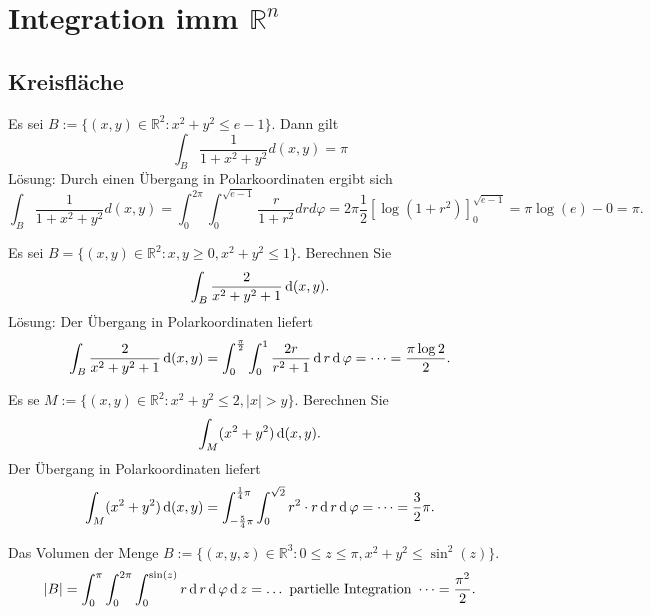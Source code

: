 \section{Integration imm $\mathbb{R}^n$}
\subsection{Kreisfläche}
Es sei $B:= \{(x,y) \in \mathbb{R}^2 : x^2 + y^2 \leq e - 1\}$.
Dann gilt
\begin{displaymath}
  \int_{B} \frac{1}{1 + x^2 + y^2}d(x,y) = \pi
\end{displaymath}
Lösung:
Durch einen Übergang in Polarkoordinaten ergibt sich
\begin{displaymath}
  \int_{B} \frac{1}{1 + x^2 + y^2} d(x,y) = \int_{0}^{2\pi} \int_{0}^{\sqrt{e - 1}} \frac{r}{1 + r^2} drd\varphi = 2\pi \frac{1}{2}[\log(1 + r^2)]_{0}^{\sqrt{e-1}} = \pi \log(e) - 0 = \pi.
\end{displaymath}

Es sei $B = \{(x,y) \in \mathbb{R}^2 : x,y \geq 0, x^2 + y^2 \leq 1\}$.
Berechnen Sie
\begin{displaymath}
  \int_B \frac{2}{x^2 + y^2 + 1} \operatorname{\mathop{}\!\mathrm{d}} (x,y).
\end{displaymath}
Lösung:
Der Übergang in Polarkoordinaten liefert
\begin{displaymath}
  \int_B \frac{2}{x^2 + y^2 + 1} \operatorname{\mathop{}\!\mathrm{d}} (x,y) = \int_0^{\frac{\pi}{2}} \int_0^1 \frac{2r}{r^2 + 1} \operatorname{\mathop{}\!\mathrm{d}} r \operatorname{\mathop{}\!\mathrm{d}} \varphi = \dots = \frac{\pi \log 2}{2}.
\end{displaymath}

Es se $M := \{(x,y) \in \mathbb{R}^2 : x^2 + y^2 \leq 2, |x| > y\}$.
Berechnen Sie
\begin{displaymath}
  \int_M (x^2 + y^2) \operatorname{\mathop{}\!\mathrm{d}} (x,y).
\end{displaymath}
Der Übergang in Polarkoordinaten liefert
\begin{displaymath}
  \int_M (x^2 + y^2) \operatorname{\mathop{}\!\mathrm{d}} (x,y) = \int_{-\frac{5}{4}\pi}^{\frac{1}{4} \pi} \int_0^{\sqrt{2}} r^2 \cdot r \operatorname{\mathop{}\!\mathrm{d}} r \operatorname{\mathop{}\!\mathrm{d}} \varphi = \dots = \frac{3}{2} \pi.
\end{displaymath}

Das Volumen der Menge $B := \{(x,y,z) \in \mathbb{R}^3 : 0 \leq z \leq \pi, x^2 + y^2 \leq \sin^2(z)\}$.
\begin{displaymath}
  |B| = \int_0^{\pi} \int_0^{2\pi} \int_0^{\sin(z)} r \operatorname{\mathop{}\!\mathrm{d}} r \operatorname{\mathop{}\!\mathrm{d}} \varphi \operatorname{\mathop{}\!\mathrm{d}} z = \dots \text{ partielle Integration } \dots = \frac{\pi^2}{2}.
\end{displaymath}

